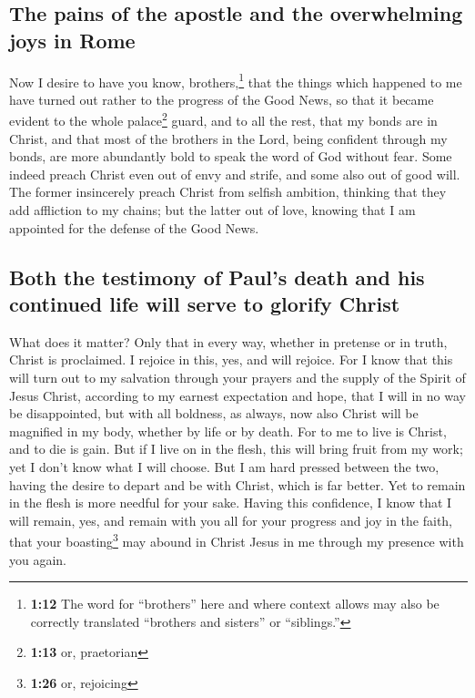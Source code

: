 \hypertarget{the-pains-of-the-apostle-and-the-overwhelming-joys-in-rome}{%
\subsection{The pains of the apostle and the overwhelming joys in
Rome}\label{the-pains-of-the-apostle-and-the-overwhelming-joys-in-rome}}

 Now I desire to have you know, brothers,\footnote{\textbf{1:12}
  The word for ``brothers'' here and where context allows may also be
  correctly translated ``brothers and sisters'' or ``siblings.''} that
the things which happened to me have turned out rather to the progress
of the Good News,  so that it became evident to the whole
palace\footnote{\textbf{1:13} or, praetorian} guard, and to all the
rest, that my bonds are in Christ,  and that most of the
brothers in the Lord, being confident through my bonds, are more
abundantly bold to speak the word of God without fear. 
Some indeed preach Christ even out of envy and strife, and some also out
of good will.  The former insincerely preach Christ from
selfish ambition, thinking that they add affliction to my chains;
 but the latter out of love, knowing that I am appointed
for the defense of the Good News.

\hypertarget{both-the-testimony-of-pauls-death-and-his-continued-life-will-serve-to-glorify-christ}{%
\subsection{Both the testimony of Paul's death and his continued life
will serve to glorify
Christ}\label{both-the-testimony-of-pauls-death-and-his-continued-life-will-serve-to-glorify-christ}}

 What does it matter? Only that in every way, whether in
pretense or in truth, Christ is proclaimed. I rejoice in this, yes, and
will rejoice.  For I know that this will turn out to my
salvation through your prayers and the supply of the Spirit of Jesus
Christ,  according to my earnest expectation and hope,
that I will in no way be disappointed, but with all boldness, as always,
now also Christ will be magnified in my body, whether by life or by
death.  For to me to live is Christ, and to die is gain.
 But if I live on in the flesh, this will bring fruit
from my work; yet I don't know what I will choose.  But I
am hard pressed between the two, having the desire to depart and be with
Christ, which is far better.  Yet to remain in the flesh
is more needful for your sake.  Having this confidence, I
know that I will remain, yes, and remain with you all for your progress
and joy in the faith,  that your boasting\footnote{\textbf{1:26}
  or, rejoicing} may abound in Christ Jesus in me through my presence
with you again.

